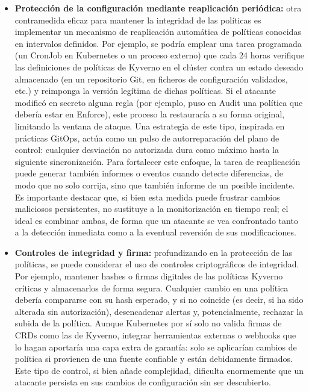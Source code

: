\documentclass[12pt,twoside,titlepage]{report}
\begin{document}
\begin{itemize}
    \item \textbf{Protección de la configuración mediante reaplicación periódica:} otra contramedida eficaz para mantener la integridad de las políticas es implementar un mecanismo de reaplicación automática de políticas conocidas en intervalos definidos. Por ejemplo, se podría emplear una tarea programada (un CronJob en Kubernetes o un proceso externo) que cada 24 horas verifique las definiciones de políticas de Kyverno en el clúster contra un estado deseado almacenado (en un repositorio Git, en ficheros de configuración validados, etc.) y reimponga la versión legítima de dichas políticas. Si el atacante modificó en secreto alguna regla (por ejemplo, puso en Audit una política que debería estar en Enforce), este proceso la restauraría a su forma original, limitando la ventana de ataque. Una estrategia de este tipo, inspirada en prácticas GitOps, actúa como un pulso de autorreparación del plano de control: cualquier desviación no autorizada dura como máximo hasta la siguiente sincronización. Para fortalecer este enfoque, la tarea de reaplicación puede generar también informes o eventos cuando detecte diferencias, de modo que no solo corrija, sino que también informe de un posible incidente. Es importante destacar que, si bien esta medida puede frustrar cambios maliciosos persistentes, no sustituye a la monitorización en tiempo real; el ideal es combinar ambas, de forma que un atacante se vea confrontado tanto a la detección inmediata como a la eventual reversión de sus modificaciones.
    \item \textbf{Controles de integridad y firma:} profundizando en la protección de las políticas, se puede considerar el uso de controles criptográficos de integridad. Por ejemplo, mantener hashes o firmas digitales de las políticas Kyverno críticas y almacenarlos de forma segura. Cualquier cambio en una política debería compararse con su hash esperado, y si no coincide (es decir, si ha sido alterada sin autorización), desencadenar alertas y, potencialmente, rechazar la subida de la política. Aunque Kubernetes por sí solo no valida firmas de CRDs como las de Kyverno, integrar herramientas externas o webhooks que lo hagan aportaría una capa extra de garantía: solo se aplicarían cambios de política si provienen de una fuente confiable y están debidamente firmados. Este tipo de control, si bien añade complejidad, dificulta enormemente que un atacante persista en sus cambios de configuración sin ser descubierto. 

\end{itemize}
\end{document}

